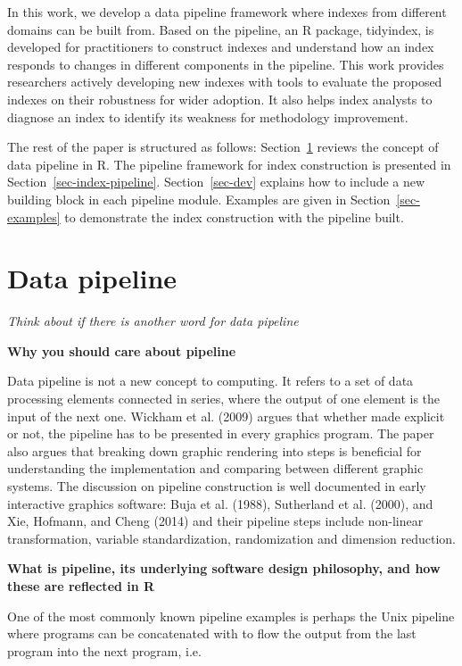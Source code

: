 \documentclass[
]{interact}
\begin{document}
In this work, we develop a data pipeline framework where indexes from
different domains can be built from. Based on the pipeline, an R
package, tidyindex, is developed for practitioners to construct indexes
and understand how an index responds to changes in different components
in the pipeline. This work provides researchers actively developing new
indexes with tools to evaluate the proposed indexes on their robustness
for wider adoption. It also helps index analysts to diagnose an index to
identify its weakness for methodology improvement.

The rest of the paper is structured as follows:
Section~\ref{sec-pipeline} reviews the concept of data pipeline in R.
The pipeline framework for index construction is presented in
Section~\ref{sec-index-pipeline}. Section~\ref{sec-dev} explains how to
include a new building block in each pipeline module. Examples are given
in Section~\ref{sec-examples} to demonstrate the index construction with
the pipeline built.

\hypertarget{sec-pipeline}{%
\section{Data pipeline}\label{sec-pipeline}}

\emph{Think about if there is another word for data pipeline}

\textbf{Why you should care about pipeline}

Data pipeline is not a new concept to computing. It refers to a set of
data processing elements connected in series, where the output of one
element is the input of the next one. Wickham et al. (2009) argues that
whether made explicit or not, the pipeline has to be presented in every
graphics program. The paper also argues that breaking down graphic
rendering into steps is beneficial for understanding the implementation
and comparing between different graphic systems. The discussion on
pipeline construction is well documented in early interactive graphics
software: Buja et al. (1988), Sutherland et al. (2000), and Xie,
Hofmann, and Cheng (2014) and their pipeline steps include non-linear
transformation, variable standardization, randomization and dimension
reduction.

\textbf{What is pipeline, its underlying software design philosophy, and
how these are reflected in R}

One of the most commonly known pipeline examples is perhaps the Unix
pipeline where programs can be concatenated with \texttt{\textbar{}} to
flow the output from the last program into the next program, i.e.~
\end{document}
